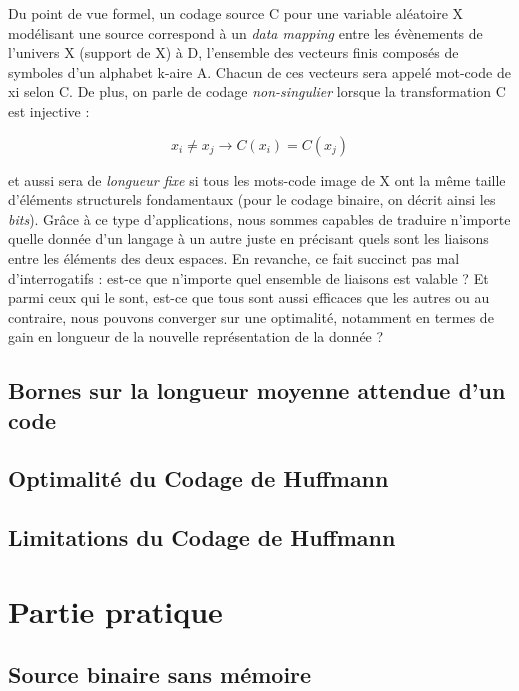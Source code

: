 \documentclass[a4paper,12pt,french]{article}
\begin{document}
    Du point de vue formel, un codage source C pour une variable aléatoire X modélisant une source correspond à un \textit{data mapping} entre les évènements de l’univers X (support de X) à D, l’ensemble des vecteurs finis composés de symboles d’un alphabet k-aire A. Chacun de ces vecteurs sera appelé mot-code de xi selon C. De plus, on parle de codage \textit{non-singulier} lorsque la transformation C est injective :

     \begin{equation}
    x_{i} \neq x_{j} \rightarrow C(x_{i}) = C(x_{j})
    \end{equation}
    
    et aussi sera de \textit{longueur fixe} si tous les mots-code image de X ont la même taille d’éléments structurels fondamentaux (pour le codage binaire, on décrit ainsi les \textit{bits}). Grâce à ce type d’applications, nous sommes capables de traduire n’importe quelle donnée d’un langage à un autre juste en précisant quels sont les liaisons entre les éléments des deux espaces. En revanche, ce fait succinct pas mal d’interrogatifs : est-ce que n’importe quel ensemble de liaisons est valable ? Et parmi ceux qui le sont, est-ce que tous sont aussi efficaces que les autres ou au contraire, nous pouvons converger sur une optimalité, notamment en termes de gain en longueur de la nouvelle représentation de la donnée ?
	
	\subsection{Bornes sur la longueur moyenne attendue d'un code}
	
	\subsection{Optimalité du Codage de Huffmann}
	
	\subsection{Limitations du Codage de Huffmann}
	
\section{Partie pratique}

	\subsection{Source binaire sans mémoire}
	
\end{document}
